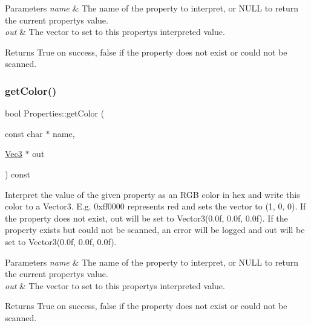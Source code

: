 \begin{DoxyParams}{Parameters}
{\em name} & The name of the property to interpret, or N\+U\+LL to return the current property\textquotesingle{}s value. \\
\hline
{\em out} & The vector to set to this property\textquotesingle{}s interpreted value.\\
\hline
\end{DoxyParams}
\begin{DoxyReturn}{Returns}
True on success, false if the property does not exist or could not be scanned. 
\end{DoxyReturn}
\mbox{\label{classProperties_aef61d49b456e4efbf6668a079b14780d}} 
\subsubsection{\texorpdfstring{get\+Color()}{getColor()}\hspace{0.1cm}{\footnotesize\ttfamily [2/4]}}
{\footnotesize\ttfamily bool Properties\+::get\+Color (\begin{DoxyParamCaption}\item[{const char $\ast$}]{name,  }\item[{\hyperlink{classVec3}{Vec3} $\ast$}]{out }\end{DoxyParamCaption}) const}

Interpret the value of the given property as an R\+GB color in hex and write this color to a Vector3. E.\+g. 0xff0000 represents red and sets the vector to (1, 0, 0). If the property does not exist, out will be set to Vector3(0.\+0f, 0.\+0f, 0.\+0f). If the property exists but could not be scanned, an error will be logged and out will be set to Vector3(0.\+0f, 0.\+0f, 0.\+0f).


\begin{DoxyParams}{Parameters}
{\em name} & The name of the property to interpret, or N\+U\+LL to return the current property\textquotesingle{}s value. \\
\hline
{\em out} & The vector to set to this property\textquotesingle{}s interpreted value.\\
\hline
\end{DoxyParams}
\begin{DoxyReturn}{Returns}
True on success, false if the property does not exist or could not be scanned. 
\end{DoxyReturn}
\mbox{\label{classProperties_a8fd1e181c6cb58cda989db6eca09ef4d}} 
